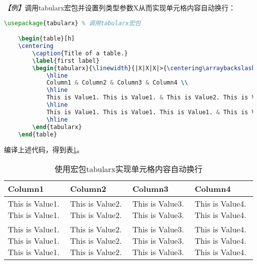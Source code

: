 \emph{【例】}调用tabularx宏包并设置列类型参数X从而实现单元格内容自动换行：
\begin{lstlisting}[language=TeX]
    \usepackage{tabularx} % 调用tabularx宏包

    \begin{table}[h]
    \centering
        \caption{Title of a table.}
        \label{first label}
        \begin{tabularx}{\linewidth}{|X|X|X|>{\centering\arraybackslash}X|} % 将需要自动换行的列的列类型参数设为X
            \hline
            Column1 & Column2 & Column3 & Column4 \\
            \hline
            This is Value1. This is Value1. & This is Value2. This is Value2. & This is Value3. This is Value3. & This is Value4. This is Value4. \\
            \hline
            This is Value1. This is Value1. This is Value1. & This is Value2. This is Value2. This is Value2. & This is Value3. This is Value3. This is Value3. & This is Value4. This is Value4. This is Value4. \\
            \hline
        \end{tabularx}
    \end{table}
\end{lstlisting}

编译上述代码，得到表\ref{tb12}。

\begin{table}[h]
    \centering
    \begin{tabularx}{\linewidth}{|X|X|X|>{\centering\arraybackslash}X|} %
        \hline
        Column1                                         & Column2                                         & Column3                                         & Column4                                         \\
        \hline
        This is Value1. This is Value1.                 & This is Value2. This is Value2.                 & This is Value3. This is Value3.                 & This is Value4. This is Value4.                 \\
        \hline
        This is Value1. This is Value1. This is Value1. & This is Value2. This is Value2. This is Value2. & This is Value3. This is Value3. This is Value3. & This is Value4. This is Value4. This is Value4. \\
        \hline
    \end{tabularx}
    \caption{使用宏包tabularx实现单元格内容自动换行}
    \label{tb12}
\end{table}

